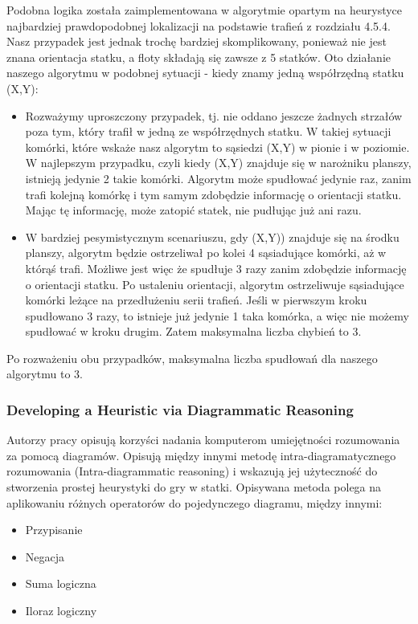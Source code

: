 Podobna logika została zaimplementowana w algorytmie opartym na heurystyce najbardziej prawdopodobnej lokalizacji na
podstawie trafień z rozdziału 4.5.4. Nasz przypadek jest jednak trochę bardziej skomplikowany, ponieważ nie jest znana orientacja statku, a floty składają się zawsze z 5 statków. Oto działanie naszego algorytmu w podobnej sytuacji - kiedy znamy jedną współrzędną statku (X,Y):

\begin{itemize}
\item Rozważymy uproszczony przypadek, tj. nie oddano jeszcze żadnych strzałów poza tym, który trafił w jedną ze współrzędnych statku. W takiej sytuacji komórki, które wskaże nasz algorytm to sąsiedzi (X,Y) w pionie i w poziomie. W najlepszym przypadku, czyli kiedy (X,Y) znajduje się w narożniku planszy, istnieją jedynie 2 takie komórki. Algorytm może spudłować jedynie raz, zanim trafi kolejną komórkę i tym samym zdobędzie informację o orientacji statku. Mając tę informację, może zatopić statek, nie pudłując już ani razu.

\item W bardziej pesymistycznym scenariuszu, gdy (X,Y)) znajduje się na środku planszy, algorytm będzie ostrzeliwał po kolei 4 sąsiadujące komórki, aż w którąś trafi. Możliwe jest więc że spudłuje 3 razy zanim zdobędzie informację o orientacji statku. Po ustaleniu orientacji, algorytm ostrzeliwuje sąsiadujące komórki leżące na przedłużeniu serii trafień. Jeśli w pierwszym kroku spudłowano 3 razy, to istnieje już jedynie 1 taka komórka, a więc nie możemy spudłować w kroku drugim. Zatem maksymalna liczba chybień to 3.
\end{itemize}

Po rozważeniu obu przypadków, maksymalna liczba spudłowań dla naszego algorytmu to 3.


\subsubsection{Developing a Heuristic via Diagrammatic Reasoning \cite{anderson1995developing}}

Autorzy pracy opisują korzyści nadania komputerom umiejętności rozumowania za pomocą diagramów. Opisują między innymi metodę intra-diagramatycznego rozumowania (Intra-diagrammatic reasoning) i wskazują jej użyteczność do stworzenia prostej heurystyki do gry w statki. Opisywana metoda polega na aplikowaniu różnych operatorów do pojedynczego diagramu, między innymi:
\begin{itemize}
    \item Przypisanie
    \item Negacja
    \item Suma logiczna
    \item Iloraz logiczny
\end{itemize}

